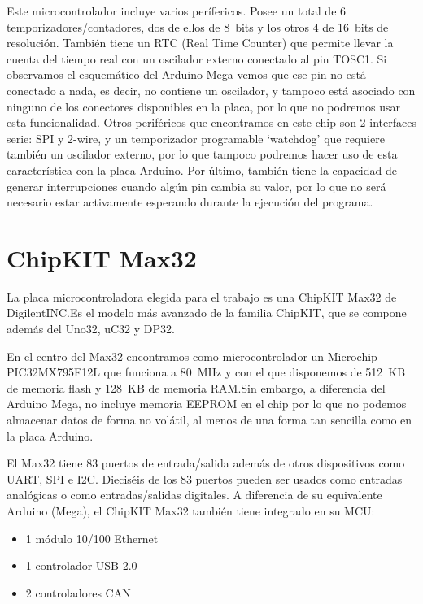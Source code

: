 Este microcontrolador incluye varios perífericos. Posee un total de 6 temporizadores/contadores, dos de ellos de 8~bits y los otros 4 de 16~bits de resolución. También tiene un RTC (Real Time Counter) que permite llevar la cuenta del tiempo real con un oscilador externo conectado al pin TOSC1. Si observamos el esquemático del Arduino Mega vemos que ese pin no está conectado a nada, es decir, no contiene un oscilador, y tampoco está asociado con ninguno de los conectores disponibles en la placa, por lo que no podremos usar esta funcionalidad. Otros periféricos que encontramos en este chip son 2 interfaces serie: SPI y 2-wire, y un temporizador programable `watchdog' que requiere también un oscilador externo, por lo que tampoco podremos hacer uso de esta característica con la placa Arduino. Por último, también tiene la capacidad de generar interrupciones cuando algún pin cambia su valor, por lo que no será necesario estar activamente esperando durante la ejecución del programa.

\section{ChipKIT Max32}
La placa microcontroladora elegida para el trabajo es una ChipKIT Max32 de DigilentINC.\@ Es el modelo más avanzado de la familia ChipKIT, que se compone además del Uno32, uC32 y DP32.


En el centro del Max32 encontramos como microcontrolador un Microchip PIC32MX795F12L que funciona a 80~MHz y con el que disponemos de 512~KB de memoria flash y 128~KB de memoria RAM.\@ Sin embargo, a diferencia del Arduino Mega, no incluye memoria EEPROM en el chip por lo que no podemos almacenar datos de forma no volátil, al menos de una forma tan sencilla como en la placa Arduino. 

El Max32 tiene 83 puertos de entrada/salida además de otros dispositivos como UART, SPI e I2C. Dieciséis de los 83 puertos pueden ser usados como entradas analógicas o como entradas/salidas digitales. A diferencia de su equivalente Arduino (Mega), el ChipKIT Max32 también tiene integrado en su MCU:
\begin{itemize}
 \item 1 módulo 10/100 Ethernet
 \item 1 controlador USB 2.0
 \item 2 controladores CAN 
 \end{itemize} 
 
